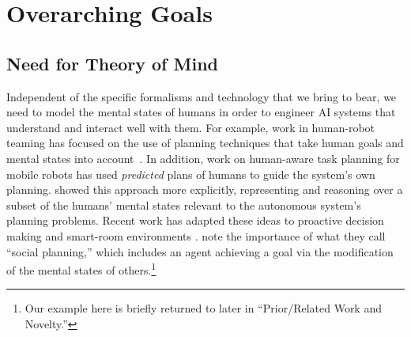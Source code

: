 \section{Overarching Goals}\label{ref:overarching_goals}

\subsection{Need for Theory of Mind}
Independent of the specific formalisms and technology
that we bring to bear, we need to
model the mental states of humans in order to engineer AI
systems that understand and interact well with them.
For example, work in human-robot teaming has focused on
the use of planning techniques that take human goals and
mental states into account~\citep{briggs_multi-modal_2012}.
In addition, work on human-aware task planning for mobile robots
\citep{cirillo2009human} has used \emph{predicted} plans of humans to
guide the system's own planning.
\citep{talamadupula2014coordination,chakraborti2015planning} showed this
approach more explicitly, representing and reasoning over a subset
of the humans' mental states relevant to the autonomous system's planning
problems.
Recent work has adapted these ideas to proactive decision making
\citep{radar2017aaaifss,kim2017aaaifss} and smart-room environments
\citep{jones2017aaaifss}.  \cite{pearce_etal_social_planning_aaai2014}
note the importance of what they call ``social planning,'' which
includes an agent achieving a goal via the modification of the mental
states of others.\footnote{Our example here is briefly returned
to later in ``Prior/Related Work and Novelty.''}


